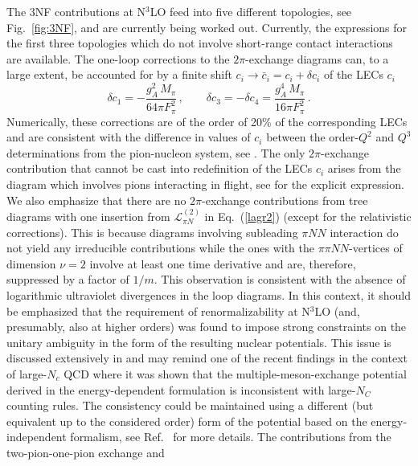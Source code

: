 \documentclass[aps,rmp,nofootinbib,twocolumn,floatfix]{revtex4}
\newcommand{\beq}{\begin{equation}}
\newcommand{\eeq}{\end{equation}}
\begin{document}
The 3NF contributions at N$^3$LO feed into five different topologies, see
Fig.~\ref{fig:3NF}, and  are currently being worked out. Currently, the
expressions for the  first three topologies which do not involve short-range
contact interactions are available. The one-loop corrections to the
$2\pi$-exchange diagrams can, to a large extent, be accounted for by a finite
shift $c_i \to \bar c_i = c_i + \delta c_i$ of the LECs $c_i$
\cite{Bernard:2007sp,Ishikawa:2007zz}  
\beq
\label{corrections_c}
\delta c_1 = - \frac{g_A^2 \,M_\pi}{64 \pi F_\pi^2}\,, \quad  \quad 
\delta c_3 =  - \delta c_4 = \frac{g_A^4 \,M_\pi}{16 \pi F_\pi^2}\,.  
\eeq
Numerically, these corrections are of the order of 20\% of the corresponding
LECs and are consistent with the difference in values of $c_i$ between the
order-$Q^2$ and $Q^3$ determinations from the pion-nucleon system, see 
\cite{Bernard:1995gx,Bernard:1996gq,Fettes:1998ud,Buettiker:1999ap}. 
The only $2\pi$-exchange contribution that cannot be cast into redefinition of
the LECs $c_i$ arises from the diagram which involves pions interacting in
flight, see \cite{Bernard:2007sp,Ishikawa:2007zz} for the explicit
expression. We also emphasize that there are no $2\pi$-exchange contributions
from tree diagrams with one insertion from $\mathcal{L}_{\pi N}^{(2)}$ in
Eq.~(\ref{lagr2}) (except for the relativistic corrections). This is because diagrams
involving subleading $\pi NN$ interaction do not yield any irreducible
contributions while the ones with the $\pi \pi NN$-vertices of dimension $\nu
= 2$  involve at least
one time derivative and are, therefore, suppressed by a factor of $1/m$.  
This observation is consistent with the absence of logarithmic ultraviolet
divergences in the loop diagrams. In this context, it should be emphasized that
the requirement of renormalizability at N$^3$LO (and, presumably, also at
higher orders) was found to impose strong constraints on the unitary ambiguity
in the form of the resulting nuclear potentials. This issue is discussed
extensively in \cite{Epelbaum:2007us} and may remind one of the recent 
findings in the context of large-$N_c$ QCD 
\cite{Belitsky:2002ni,Cohen:2002qn,Cohen:2002im} where it was
shown that the multiple-meson-exchange potential derived in the energy-dependent
formulation is inconsistent with large-$N_C$ counting rules. The consistency
could be maintained using a different (but equivalent up to the considered order)
form of the potential based on the energy-independent formalism, 
see Ref.~\cite{Cohen:2002im} for more details. 
The contributions from the two-pion-one-pion exchange and
\end{document}
